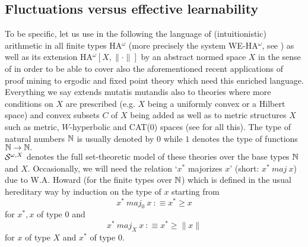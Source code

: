 \subsection{Fluctuations versus effective learnability}
To be specific, let us use in the following the language of (intuitionistic) 
arithmetic in all finite types HA$^{\omega}$ (more precisely the system 
WE-HA$^{\omega}$, see \cite{Kohlenbach08}) as well as its extension HA$^{\omega}[X,\|\cdot\|]$ 
by an abstract normed space $X$ in the sense of \cite{Kohlenbach05meta,GerKoh06,Kohlenbach08} in order to be able to cover also the aforementioned 
recent applications of proof mining to ergodic and fixed point theory which 
need this enriched language. Everything we say extends mutatis mutandis also 
to theories where more conditions on $X$ are prescribed (e.g. $X$ being 
a uniformly convex or a Hilbert space) and convex subsets $C$ of $X$ being 
added as well as to metric structures $X$ 
such as metric, $W$-hyperbolic and CAT(0) spaces (see \cite{Kohlenbach08} 
for all this). The type of natural numbers $\mathbb{N}$ is usually denoted by $0$ 
while $1$ denotes the type of functions $\mathbb{N}\to\mathbb{N}.$
\\[1mm] ${\cal S}^{\omega,X}$ denotes the full set-theoretic model of these 
theories over the base types $\mathbb{N}$ and $X.$ Occasionally, we will need 
the relation `$x^*$ majorizes $x$' (short: $x^* \ maj \ x$) due to W.A. Howard 
(for the finite types over $\mathbb{N}$)  
which is defined in the usual hereditary 
way by induction on the type of $x$ starting from 
\[ x^* \ maj_0 \ x\ :\equiv x^*\ge x \] for $x^*,x$ of type $0$ and 
\[ x^* \ maj_X \ x\ :\equiv x^* \ge \| x\|\] for $x$ of type $X$ and 
$x^*$ of type $0.$ 


